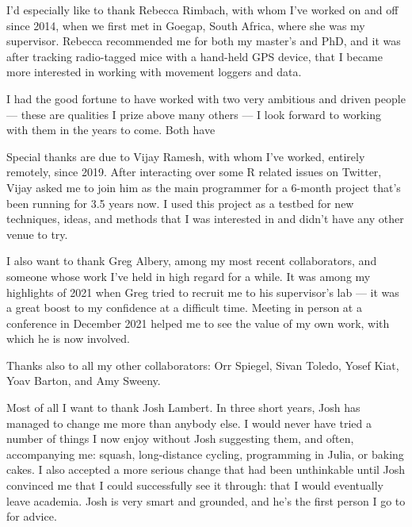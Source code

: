 I'd especially like to thank Rebecca Rimbach, with whom I've worked on and off since 2014, when we first met in Goegap, South Africa, where she was my supervisor.
Rebecca recommended me for both my master's and PhD, and it was after tracking radio-tagged mice with a hand-held GPS device, that I became more interested in working with movement loggers and data.

\medskip

I had the good fortune to have worked with two very ambitious and driven people --- these are qualities I prize above many others --- I look forward to working with them in the years to come.
Both have 

Special thanks are due to Vijay Ramesh, with whom I've worked, entirely remotely, since 2019.
After interacting over some R related issues on Twitter, Vijay asked me to join him as the main programmer for a 6-month project that's been running for 3.5 years now.
I used this project as a testbed for new techniques, ideas, and methods that I was interested in and didn't have any other venue to try.

I also want to thank Greg Albery, among my most recent collaborators, and someone whose work I've held in high regard for a while.
It was among my highlights of 2021 when Greg tried to recruit me to his supervisor's lab --- it was a great boost to my confidence at a difficult time.
Meeting in person at a conference in December 2021 helped me to see the value of my own work, with which he is now involved.

Thanks also to all my other collaborators: Orr Spiegel, Sivan Toledo, Yosef Kiat, Yoav Barton, and Amy Sweeny.

\medskip

Most of all I want to thank Josh Lambert.
In three short years, Josh has managed to change me more than anybody else.
I would never have tried a number of things I now enjoy without Josh suggesting them, and often, accompanying me: squash, long-distance cycling, programming in Julia, or baking cakes.
I also accepted a more serious change that had been unthinkable until Josh convinced me that I could successfully see it through: that I would eventually leave academia.
Josh is very smart and grounded, and he's the first person I go to for advice.

\endgroup
